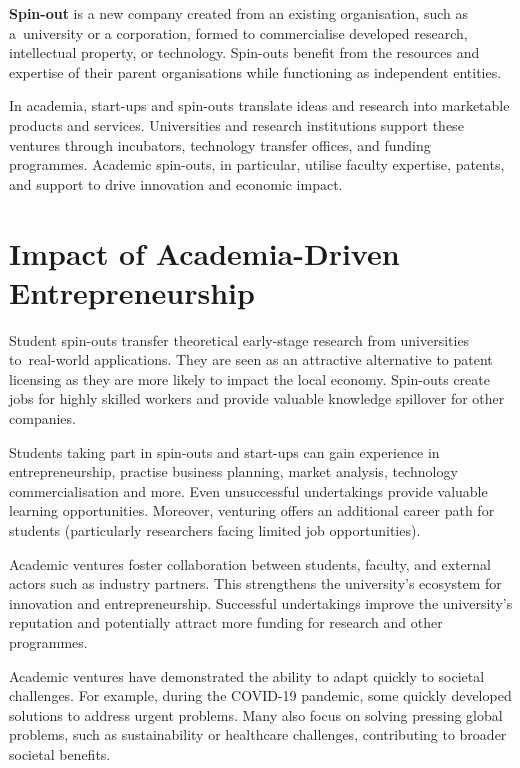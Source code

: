 \textbf{Spin-out} is a new company created from an existing organisation, such as a~university or a corporation, formed to commercialise developed research, intellectual property, or technology. Spin-outs benefit from the resources and expertise of their parent organisations while functioning as independent entities.\cite{mfmac_spin-out}

In academia, start-ups and spin-outs translate ideas and research into marketable products and services. Universities and research institutions support these ventures through incubators, technology transfer offices, and funding programmes. Academic spin-outs, in particular, utilise faculty expertise, patents, and support to drive innovation and economic impact.

\section{Impact of Academia-Driven Entrepreneurship}
Student spin-outs transfer theoretical early-stage research from universities to~real-world applications. They are seen as an attractive alternative to patent licensing as they are more likely to impact the local economy. Spin-outs create jobs for highly skilled workers and provide valuable knowledge spillover for other companies.\cite{Caputo_spin-offs-impact}

Students taking part in spin-outs and start-ups can gain experience in entrepreneurship, practise business planning, market analysis, technology commercialisation and more. Even unsuccessful undertakings provide valuable learning opportunities. Moreover, venturing offers an additional career path for students (particularly researchers facing limited job opportunities).\cite{kauffman_tech-transfer}

Academic ventures foster collaboration between students, faculty, and external actors such as industry partners. This strengthens the university's ecosystem for innovation and entrepreneurship. Successful undertakings improve the university's reputation and potentially attract more funding for research and other programmes.

Academic ventures have demonstrated the ability to adapt quickly to societal challenges. For example, during the COVID-19 pandemic, some quickly developed solutions to address urgent problems. Many also focus on solving pressing global problems, such as sustainability or healthcare challenges, contributing to broader societal benefits.\cite{Battaglia_spin-off-response}


